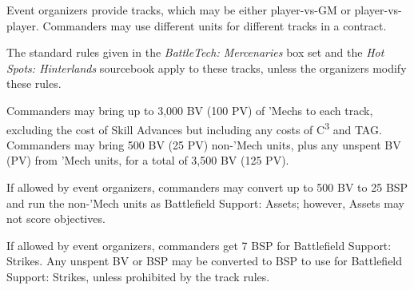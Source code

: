 Event organizers provide tracks, which may be either player-vs-GM or player-vs-player.
Commanders may use different units for different tracks in a contract.

The standard rules given in the \emph{BattleTech: Mercenaries} box set and the \emph{Hot Spots: Hinterlands} sourcebook apply to these tracks, unless the organizers modify these rules.

Commanders may bring up to 3,000 BV (100 PV) of 'Mechs to each track, excluding the cost of Skill Advances but including any costs of C\textsuperscript{3} and TAG.
Commanders may bring 500 BV (25 PV) non-'Mech units, plus any unspent BV (PV) from 'Mech units, for a total of 3,500 BV (125 PV).

If allowed by event organizers, commanders may convert up to 500 BV to 25 BSP and run the non-'Mech units as Battlefield Support: Assets; however, Assets may not score objectives.

If allowed by event organizers, commanders get 7 BSP for Battlefield Support: Strikes.
Any unspent BV or BSP may be converted to BSP to use for Battlefield Support: Strikes, unless prohibited by the track rules.
